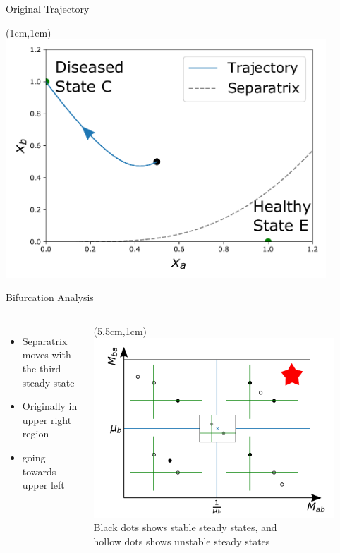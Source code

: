 \documentclass[15pt]{beamer}
\begin{document}
\begin{frame}{Original Trajectory}
	\begin{textblock*}{12cm}(1cm,1cm) %
	 \includegraphics[width=0.9\textwidth]{original}
	\end{textblock*}
\end{frame}

\begin{frame}{Bifurcation Analysis}

\begin{columns}
\begin{itemize}
	\item Separatrix moves with the third steady state
	\item Originally in upper right region
	\item going towards upper left
\end{itemize}
	\begin{textblock*}{7.6cm}(5.5cm,1cm) %
	 \includegraphics[width=0.9\textwidth]{bifurcation}
	 {\small
	  Black dots shows stable steady states, and \\hollow dots shows unstable steady states}
	\end{textblock*}
\end{columns}
\end{frame}
\end{document}
